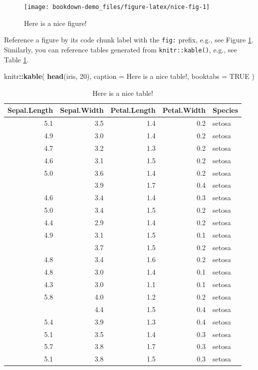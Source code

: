 \documentclass[
]{book}
\newenvironment{Shaded}{\begin{snugshade}}{\end{snugshade}}
\newcommand{\AttributeTok}[1]{\textcolor[rgb]{0.13,0.29,0.53}{#1}}
\newcommand{\ConstantTok}[1]{\textcolor[rgb]{0.56,0.35,0.01}{#1}}
\newcommand{\DecValTok}[1]{\textcolor[rgb]{0.00,0.00,0.81}{#1}}
\newcommand{\FunctionTok}[1]{\textcolor[rgb]{0.13,0.29,0.53}{\textbf{#1}}}
\newcommand{\NormalTok}[1]{#1}
\newcommand{\SpecialCharTok}[1]{\textcolor[rgb]{0.81,0.36,0.00}{\textbf{#1}}}
\newcommand{\StringTok}[1]{\textcolor[rgb]{0.31,0.60,0.02}{#1}}
\begin{document}
\begin{figure}

{\centering \texttt{[image: bookdown-demo\_files/figure-latex/nice-fig-1]} 

}

\caption{Here is a nice figure!}\label{fig:nice-fig}
\end{figure}

Reference a figure by its code chunk label with the \texttt{fig:} prefix, e.g., see Figure \ref{fig:nice-fig}. Similarly, you can reference tables generated from \texttt{knitr::kable()}, e.g., see Table \ref{tab:nice-tab}.

\begin{Shaded}
\begin{Highlighting}[]
\NormalTok{knitr}\SpecialCharTok{::}\FunctionTok{kable}\NormalTok{(}
  \FunctionTok{head}\NormalTok{(iris, }\DecValTok{20}\NormalTok{), }\AttributeTok{caption =} \StringTok{\textquotesingle{}Here is a nice table!\textquotesingle{}}\NormalTok{,}
  \AttributeTok{booktabs =} \ConstantTok{TRUE}
\NormalTok{)}
\end{Highlighting}
\end{Shaded}

\begin{table}

\caption{\label{tab:nice-tab}Here is a nice table!}
\centering
\begin{tabular}[t]{rrrrl}
\toprule
Sepal.Length & Sepal.Width & Petal.Length & Petal.Width & Species\\
\midrule
5.1 & 3.5 & 1.4 & 0.2 & setosa\\
4.9 & 3.0 & 1.4 & 0.2 & setosa\\
4.7 & 3.2 & 1.3 & 0.2 & setosa\\
4.6 & 3.1 & 1.5 & 0.2 & setosa\\
5.0 & 3.6 & 1.4 & 0.2 & setosa\\
\addlinespace
5.4 & 3.9 & 1.7 & 0.4 & setosa\\
4.6 & 3.4 & 1.4 & 0.3 & setosa\\
5.0 & 3.4 & 1.5 & 0.2 & setosa\\
4.4 & 2.9 & 1.4 & 0.2 & setosa\\
4.9 & 3.1 & 1.5 & 0.1 & setosa\\
\addlinespace
5.4 & 3.7 & 1.5 & 0.2 & setosa\\
4.8 & 3.4 & 1.6 & 0.2 & setosa\\
4.8 & 3.0 & 1.4 & 0.1 & setosa\\
4.3 & 3.0 & 1.1 & 0.1 & setosa\\
5.8 & 4.0 & 1.2 & 0.2 & setosa\\
\addlinespace
5.7 & 4.4 & 1.5 & 0.4 & setosa\\
5.4 & 3.9 & 1.3 & 0.4 & setosa\\
5.1 & 3.5 & 1.4 & 0.3 & setosa\\
5.7 & 3.8 & 1.7 & 0.3 & setosa\\
5.1 & 3.8 & 1.5 & 0.3 & setosa\\
\bottomrule
\end{tabular}
\end{table}
\end{document}
